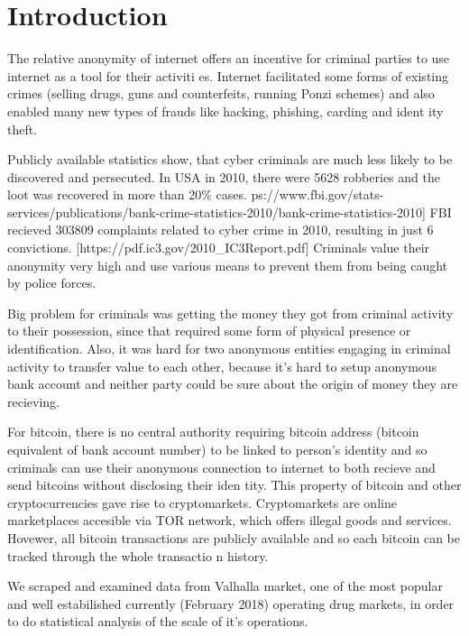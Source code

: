 \documentclass[
  digital, %
  table,   %
  lof,     %
  lot,     %
  oneside
]{fithesis3}
\begin{document}
\chapter{Introduction}

The relative anonymity of internet offers an incentive for criminal parties to use internet as a tool for their activiti
es.
Internet facilitated some forms of existing crimes (selling drugs, guns and
counterfeits, running Ponzi schemes) and also enabled many new types of frauds like hacking, phishing, carding and ident
ity theft.

Publicly available statistics show, that cyber criminals are much
 less likely to be discovered and persecuted.
 In USA in 2010, there were 5628 robberies and the loot was recovered in more than 20\% cases. \parencite{fbi10}  %
ps://www.fbi.gov/stats-services/publications/bank-crime-statistics-2010/bank-crime-statistics-2010]
 FBI recieved 303809 complaints related to cyber crime in 2010, resulting in just 6 convictions. \parencite{fbcyber}  %
[https://pdf.ic3.gov/2010_IC3Report.pdf]
Criminals value their anonymity very high and use various means to prevent them from being caught by police forces.

Big problem for criminals was getting the money they got from criminal activity to their possession,
since that required some form of physical presence or identification.
Also, it was hard for two anonymous entities engaging in criminal activity to transfer value to each other,
 because it's hard to setup anonymous bank account and neither party could be sure about the origin of
 money they are recieving.

For bitcoin, there is no central authority requiring bitcoin address
(bitcoin equivalent of bank account number) to be linked to person's identity and so 
criminals can use their anonymous connection to internet to both recieve and send bitcoins without disclosing their iden
tity.
This property of bitcoin and other cryptocurrencies gave rise to cryptomarkets.
 Cryptomarkets are online marketplaces accesible via TOR network, which offers illegal goods and services.
Hovewer, all bitcoin transactions are publicly available and so each bitcoin can be tracked through the whole transactio
n history.

We scraped and examined data from Valhalla market,
 one of the most popular and well estabilished currently (February 2018) operating drug markets,
in order to do statistical analysis of the scale of it's operations.
\end{document}
